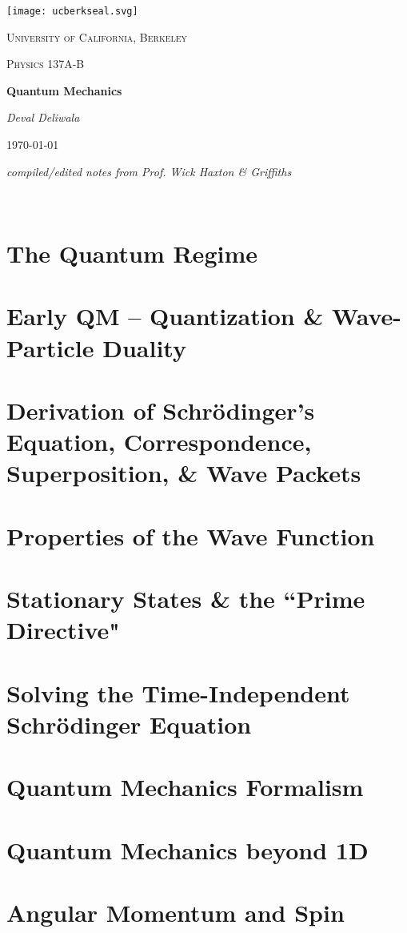 \documentclass[10pt,letterpaper, twocolumn]{report}
\begin{document}
\begin{titlepage}
	\centering
	\texttt{[image: ucberkseal.svg]}\par\vspace{1cm}
	{\LARGE \textsc{University of California, Berkeley}\par}
	\vspace{1cm}
	{\Large \textsc{Physics 137A-B}\par}
	\vspace{1.5cm}
	{\huge\bfseries Quantum Mechanics \par}
	\vspace{2cm}
	{\Large\itshape Deval Deliwala\par}
	\vfill
	\vfill
	{\large \today\par}
  \vspace{5px}
  {\small \textit{compiled/edited notes from Prof. Wick Haxton \& Griffiths}}
\end{titlepage}

\newpage\
\newpage\
\tableofcontents
\newpage\

\chapter{The Quantum Regime}

\chapter{Early QM -- Quantization \& Wave-Particle Duality}

\chapter{Derivation of Schr\"odinger's Equation, Correspondence, Superposition,
\& Wave Packets}

\chapter{Properties of the Wave Function}

\chapter{Stationary States \& the ``Prime Directive"}

\chapter{Solving the Time-Independent Schr\"odinger Equation}

\chapter{Quantum Mechanics Formalism} 

\chapter{Quantum Mechanics beyond 1D}

\chapter{Angular Momentum and Spin} 
 
\end{document}
